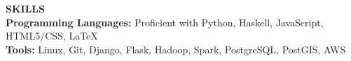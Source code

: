 \noindent\textbf{SKILLS} \\
\textbf{Programming Languages:} Proficient with Python, Haskell, JavaScript, HTML5/CSS, \LaTeX\\
\textbf{Tools:} Linux, Git, Django, Flask, Hadoop, Spark, PostgreSQL, PostGIS, AWS \\

